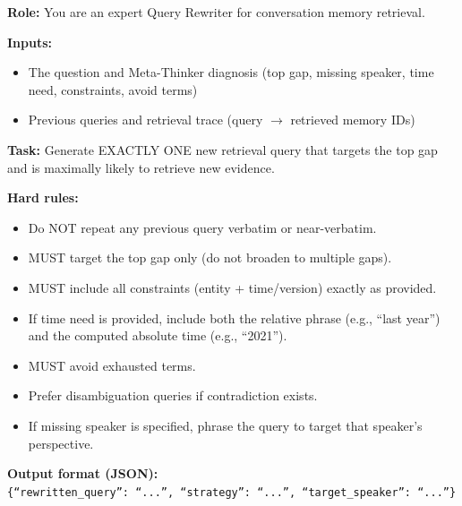\begin{table}[t]
\caption{The prompt template used for Query Reasoner $\pi_r$ to generate orthogonal query $u_{h+1}$.}
\begin{promptbox}
\noindent\textbf{Role:} You are an expert Query Rewriter for conversation memory retrieval.

\medskip
\noindent\textbf{Inputs:}
\begin{itemize}[leftmargin=*]
\item The question and Meta-Thinker diagnosis (top gap, missing speaker, time need, constraints, avoid terms)
\item Previous queries and retrieval trace (query $\to$ retrieved memory IDs)
\end{itemize}

\noindent\textbf{Task:} Generate EXACTLY ONE new retrieval query that targets the top gap and is maximally likely to retrieve new evidence.

\medskip
\noindent\textbf{Hard rules:}
\begin{itemize}[leftmargin=*]
\item Do NOT repeat any previous query verbatim or near-verbatim.
\item MUST target the top gap only (do not broaden to multiple gaps).
\item MUST include all constraints (entity + time/version) exactly as provided.
\item If time need is provided, include both the relative phrase (e.g., ``last year'') and the computed absolute time (e.g., ``2021'').
\item MUST avoid exhausted terms.
\item Prefer disambiguation queries if contradiction exists.
\item If missing speaker is specified, phrase the query to target that speaker's perspective.
\end{itemize}

\medskip
\noindent\textbf{Output format (JSON):}\\
\texttt{\{``rewritten\_query'': ``...'', ``strategy'': ``...'', ``target\_speaker'': ``...''\}}
\end{promptbox}
\label{tab:prompt_orthogonal_query}
\end{table}

